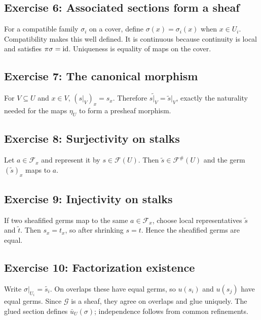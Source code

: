 \subsection*{Exercise 6: Associated sections form a sheaf}
\begin{solution}
For a compatible family $\sigma_i$ on a cover, define $\sigma(x)=\sigma_i(x)$ when $x\in U_i$.  Compatibility makes this well defined.  It is continuous because continuity is local and satisfies $\pi\sigma=\operatorname{id}$.  Uniqueness is equality of maps on the cover.
\end{solution}

\subsection*{Exercise 7: The canonical morphism}
\begin{solution}
For $V\subseteq U$ and $x\in V$, $(s|_V)_x=s_x$.  Therefore $\widetilde{s|_V}=\widetilde s|_V$, exactly the naturality needed for the maps $\eta_U$ to form a presheaf morphism.
\end{solution}

\subsection*{Exercise 8: Surjectivity on stalks}
\begin{solution}
Let $a\in\mathcal F_x$ and represent it by $s\in\mathcal F(U)$.  Then $\widetilde s\in\mathcal F^\#(U)$ and the germ $(\widetilde s)_x$ maps to $a$.
\end{solution}

\subsection*{Exercise 9: Injectivity on stalks}
\begin{solution}
If two sheafified germs map to the same $a\in\mathcal F_x$, choose local representatives $\widetilde s$ and $\widetilde t$.  Then $s_x=t_x$, so after shrinking $s=t$.  Hence the sheafified germs are equal.
\end{solution}

\subsection*{Exercise 10: Factorization existence}
\begin{solution}
Write $\sigma|_{U_i}=\widetilde{s_i}$.  On overlaps these have equal germs, so $u(s_i)$ and $u(s_j)$ have equal germs.  Since $\mathcal G$ is a sheaf, they agree on overlaps and glue uniquely.  The glued section defines $\bar u_U(\sigma)$; independence follows from common refinements.
\end{solution}

